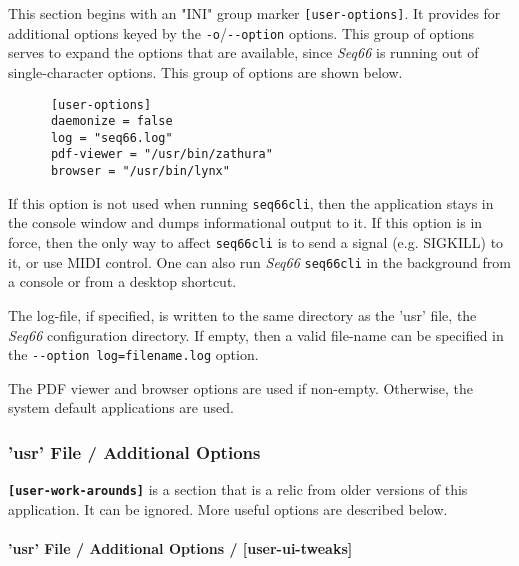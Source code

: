    This section begins with an
   "INI" group marker \texttt{[user-options]}.
   It provides for additional options keyed by the
   \texttt{-o}/\texttt{-{}-option} options.
   This group of options serves to expand the options that are available, since
   \textsl{Seq66} is running out of single-character options.
   This group of options are shown below.

   \begin{verbatim}
      [user-options]
      daemonize = false
      log = "seq66.log"
      pdf-viewer = "/usr/bin/zathura"
      browser = "/usr/bin/lynx"
   \end{verbatim}

   If this option is not used when running \texttt{seq66cli}, then the
   application stays in the console window and dumps informational output to
   it.  If this option is in force, then the only way to affect
   \texttt{seq66cli} is to send a signal (e.g. SIGKILL) to it, or use
   MIDI control.
   One can also run \textsl{Seq66}
   \texttt{seq66cli} in the background from a console or
   from a desktop shortcut.

   The log-file, if specified, is written to the same directory as the 'usr'
   file, the \textsl{Seq66} configuration directory.
   If empty, then a valid file-name can be specified
   in the \texttt{-{}-option log=filename.log} option.

   The PDF viewer and browser options are used if non-empty.
   Otherwise, the system default applications are used.

\subsubsection{'usr' File / Additional Options}
\label{subsubsec:usr_file_added_options}

   \textbf{\texttt{[user-work-arounds]}} is a section that is a relic from
   older versions of this application.  It can be ignored.  More useful options
   are described below.

\paragraph{'usr' File / Additional Options / [user-ui-tweaks]}
\label{paragraph:user_file_added_options_tweaks}

